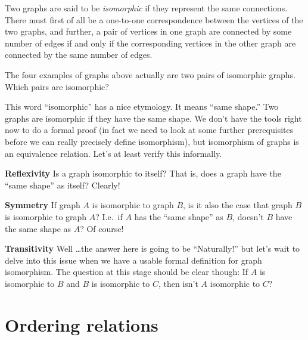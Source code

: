\begin{center}

\end{center}

Two graphs are said to be  \emph{isomorphic} if they
represent the same connections.  There must first of all be a one-to-one correspondence
between the vertices of the two graphs, and further, a pair of vertices in one
graph are connected by some number of edges if and only if the corresponding vertices in the other graph
are connected by the same number of edges.

\begin{exer}
The four examples of graphs above actually are two pairs of isomorphic graphs.
Which pairs are isomorphic?
\end{exer}

This word ``isomorphic'' has a nice etymology.  It means ``same shape.''  Two graphs are
isomorphic if they have the same shape.  We don't have the tools right now to do a formal
proof (in fact we need to look at some further prerequisites before we can really precisely
define isomorphism), but isomorphism of graphs is an equivalence relation.  Let's at least 
verify this informally.

{\bf Reflexivity}  Is a graph isomorphic to itself?  That is, does a graph have the ``same 
shape'' as itself?  Clearly!

{\bf Symmetry}  If graph $A$ is isomorphic to graph $B$, is it also the case that graph $B$
is isomorphic to graph $A$?  I.e.\ if $A$ has the ``same shape'' as $B$, doesn't $B$ have the
same shape as $A$?  Of course!

{\bf Transitivity}  Well \ldots the answer here is going to be ``Naturally!'' but let's wait
to delve into this issue when we have a usable formal definition for graph isomorphism.  The
question at this stage should be clear though: If $A$ is isomorphic to $B$ and $B$ is isomorphic 
to $C$, then isn't $A$ isomorphic to $C$?

\newpage





\newpage

\section{Ordering relations}
\label{sec:ord_rel}

